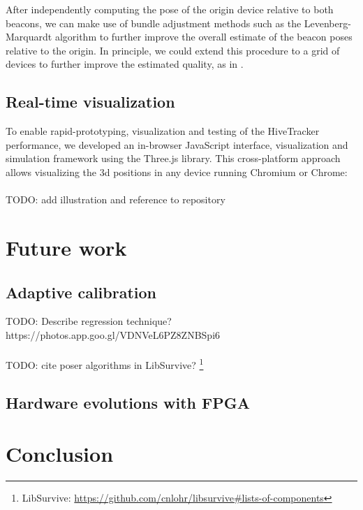 \documentclass[sigchi]{acmart}
\begin{document}
After independently computing the pose of the origin device relative to both beacons, we can make use of bundle adjustment methods such as the Levenberg-Marquardt algorithm \cite{Marquardt1963} to further improve the overall estimate of the beacon poses relative to the origin. In principle, we could extend this procedure to a grid of devices to further improve the estimated quality, as in \cite{Garrido-Jurado2014}.

\subsection{Real-time visualization}

To enable rapid-prototyping, visualization and testing of the HiveTracker performance, we developed an in-browser JavaScript interface, visualization and simulation framework using the Three.js library. This cross-platform approach allows visualizing the 3d positions in any device running Chromium or Chrome:
\\\\
TODO: add illustration and reference to repository \cite{WebappRepo}

\section{Future work}

\subsection{Adaptive calibration}

TODO: Describe regression technique?\\
https://photos.app.goo.gl/VDNVeL6PZ8ZNBSpi6
\\\\
TODO: cite poser algorithms in LibSurvive? \footnote{LibSurvive: \url{https://github.com/cnlohr/libsurvive\#lists-of-components}}

\subsection{Hardware evolutions with FPGA}

\section{Conclusion}
\end{document}
